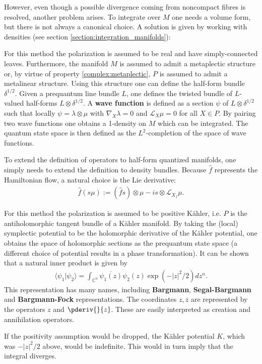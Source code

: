     However, even though a possible divergence coming from noncompact fibres is resolved, another problem arises. To integrate over $M$ one needs a volume form, but there is not always a canonical choice. A solution is given by working with densities (see section \ref{section:integration_manifolds}):
    \begin{method}
        For this method the polarization is assumed to be real and have simply-connected leaves. Furthermore, the manifold $M$ is assumed to admit a metaplectic structure or, by virtue of property \ref{complex:metaplectic}, $P$ is assumed to admit a metalinear structure. Using this structure one can define the half-form bundle $\delta^{1/2}$. Given a prequantum line bundle $L$, one defines the twisted bundle of $L$-valued half-forms $L\otimes\delta^{1/2}$. A \textbf{wave function} is defined as a section $\psi$ of $L\otimes\delta^{1/2}$ such that locally $\psi=\lambda\otimes\mu$ with $\nabla_X\lambda=0$ and $\mathcal{L}_X\mu=0$ for all $X\in P$. By pairing two wave functions one obtains a 1-density on $M$ which can be integrated. The quantum state space is then defined as the $L^2$-completion of the space of wave functions.

        To extend the definition of operators to half-form quantized manifolds, one simply needs to extend the definition to density bundles. Because $\hat{f}$ represents the Hamiltonian flow, a natural choice is the Lie derivative:
        \begin{gather}
            \hat{f}(s\mu) := (\hat{f}s)\otimes\mu - is\otimes\mathcal{L}_{X_f}\mu.
        \end{gather}
    \end{method}

    \begin{example}
        For this method the polarization is assumed to be positive K\"ahler, i.e. $P$ is the antiholomorphic tangent bundle of a K\"ahler manifold. By taking the (local) symplectic potential to be the holomorphic derivative of the K\"ahler potential, one obtains the space of holomorphic sections as the prequantum state space (a different choice of potential results in a phase transformation). It can be shown that a natural inner product is given by
        \begin{gather}
            \langle \psi_1|\psi_2 \rangle = \int_{\mathbb{C}^n}\overline{\psi_1(z)}\psi_2(z)\exp(-|z|^2/2)dz^n.
        \end{gather}
        This representation has many names, including \textbf{Bargmann}, \textbf{Segal-Bargmann} and \textbf{Bargmann-Fock} representations. The coordinates $z,\overline{z}$ are represented by the operators $z$ and $\pderiv{}{z}$. These are easily interpreted as creation and annihilation operators.
    \end{example}
    \begin{remark}
        If the positivity assumption would be dropped, the K\"ahler potential $K$, which was $-|z|^2/2$ above, would be indefinite. This would in turn imply that the integral diverges.
    \end{remark}

